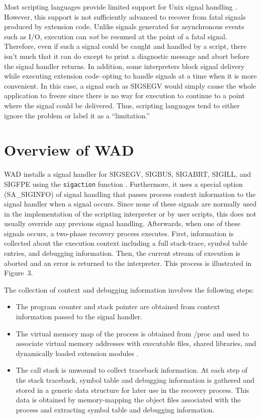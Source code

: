 Most scripting languages provide limited support for Unix signal
handling \cite{stevens}.  However, this support is not sufficiently advanced to
recover from fatal signals produced by extension code.
Unlike signals generated for asynchronous events such as I/O,
execution can {\em not} be resumed at the point of a fatal signal.
Therefore, even if such a signal could be caught and handled by a script,
there isn't much that it can do except to print a diagnostic
message and abort before the signal handler returns.  In addition,
some interpreters block signal delivery while executing
extension code--opting to handle signals at a time when it is more convenient.
In this case, a signal such as SIGSEGV would simply cause the whole application
to freeze since there is no way for execution to continue to a point where
the signal could be delivered.  Thus, scripting languages tend to 
either ignore the problem or label it as a ``limitation.''

\section{Overview of WAD}

WAD installs a signal handler for SIGSEGV, SIGBUS, SIGABRT, SIGILL,
and SIGFPE using the {\tt sigaction} function
\cite{stevens}. Furthermore, it uses a special option (SA\_SIGINFO) of
signal handling that passes process context information to the signal
handler when a signal occurs. Since none of these signals are normally used in the
implementation of the scripting interpreter or by user scripts,
this does not usually override any previous signal handling.
Afterwards, when one of these signals occurs, a two-phase recovery
process executes. First, information is collected about the execution
context including a full stack-trace, symbol table entries, and
debugging information.  Then, the current stream of execution is
aborted and an error is returned to the interpreter.  This process is
illustrated in Figure~3.

The collection of context and debugging information involves the
following steps:

\begin{itemize}
\item The program counter and stack pointer are obtained from 
context information passed to the signal handler.

\item The virtual memory map of the process is obtained from /proc
and used to associate virtual memory addresses with executable files,
shared libraries, and dynamically loaded extension modules \cite{proc}.

\item The call stack is unwound to collect traceback information.
At each step of the stack traceback, symbol table and debugging
information is gathered and stored in a generic data structure for later use
in the recovery process.  This data is obtained by memory-mapping
the object files associated with the process and extracting
symbol table and debugging information. 
\end{itemize}

